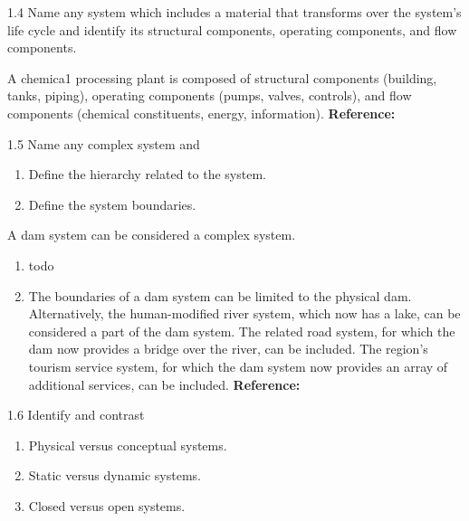 \begin{exsol@exercise}{1.4}
    \label{sea-1-3}
        Name any system which includes a material that transforms over the system's life cycle and identify its structural components, operating components, and flow components.
\end{exsol@exercise}
\begin{exsol@solution}{}
        A chemica1 processing plant is composed of structural components (building, tanks, piping), operating components (pumps, valves, controls), and flow components (chemical constituents, energy, information). \textbf{Reference:}
\end{exsol@solution}
\begin{exsol@exercise}{1.5}
    \label{sea-1-4_5}
        Name any complex system and
        \begin{enumerate}[label=\alph*)]
            \item Define the hierarchy related to the system.
            \item Define the system boundaries.
        \end{enumerate}
\end{exsol@exercise}
\begin{exsol@solution}{}
        A dam system can be considered a complex system.
        \begin{enumerate}[label=\alph*)]
            \item todo
            \item The boundaries of a dam system can be limited to the physical dam. Alternatively, the human-modified river system, which now has a lake, can be considered a part of the dam system. The related road system, for which the dam now provides a bridge over the river, can be included. The region’s tourism service system, for which the dam system now provides an array of additional services, can be included. \textbf{Reference:}
        \end{enumerate}
\end{exsol@solution}
\begin{exsol@exercise}{1.6}
    \label{sea-1-6_7_8}
        Identify and contrast
        \begin{enumerate}[label=\alph*)]
            \item Physical versus conceptual systems.
            \item Static versus dynamic systems.
            \item Closed versus open systems.
        \end{enumerate}
\end{exsol@exercise}
